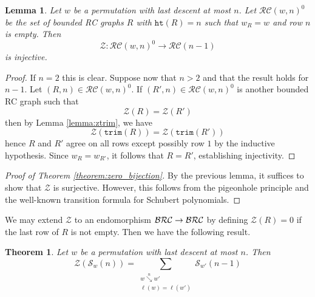 \documentclass{amsart}
\newtheorem{lemma}{Lemma}[subsection]
\newtheorem{theorem}{Theorem}[section]
\theoremstyle{definition}
\theoremstyle{remark}
\numberwithin{equation}{subsection}
\newcommand{\downvar}[1]{\stackrel{#1}{\searrow}}
\newcommand{\wof}[1]{w_{#1}}
\newcommand{\trm}{\mathtt{trim}}
\newcommand{\zeromap}{\mathcal{Z}}
\newcommand{\hr}{\mathtt{ht}}
\begin{document}
\begin{lemma} \label{lemma:zero_injective}
Let $w$ be a permutation with last descent at most $n$. Let $\mathcal{RC}(w,n)^0$ be the set of bounded RC graphs $R$ with $\hr(R) = n$ such that $\wof{R}=w$ and row $n$ is empty. Then
$$\zeromap:\mathcal{RC}(w, n)^{0}\to \mathcal{RC}(n-1)$$
is injective.
\end{lemma}
\begin{proof}
If $n=2$ this is clear. Suppose now that $n > 2$ and that the result holds for $n-1$. Let $(R, n)\in \mathcal{RC}(w, n)^0$. If $(R', n)\in\mathcal{RC}(w,n)^0$ is another bounded RC graph such that
$$\zeromap(R) = \zeromap(R')$$
then by Lemma \ref{lemma:ztrim}, we have
$$\zeromap(\trm(R)) = \zeromap(\trm(R'))$$
hence $R$ and $R'$ agree on all rows except possibly row $1$ by the inductive hypothesis. Since $\wof{R} = \wof{R'}$, it follows that $R = R'$, establishing injectivity. 
\end{proof}

\begin{proof}[Proof of Theorem \ref{theorem:zero_bijection}]
By the previous lemma, it suffices to show that $\zeromap$ is surjective. However, this follows from the pigeonhole principle and the well-known transition formula for Schubert polynomials.
\end{proof}


We may extend $\zeromap$ to an endomorphism $\mathcal{BRC}\to\mathcal{BRC}$ by defining $\zeromap(R) = 0$ if the last row of $R$ is not empty. Then we have the following result.

\begin{theorem} \label{theorem:transition}
	Let $w$ be a permutation with last descent at most $n$. Then
	$$\zeromap(\mathcal{S}_w(n))=\sum_{\substack{w\downvar{n} w'\\\ell(w)=\ell(w')}}\mathcal{S}_{w'}(n-1)$$
\end{theorem} 



\newcommand{\clp}{\mathtt{clip}}
\end{document}
